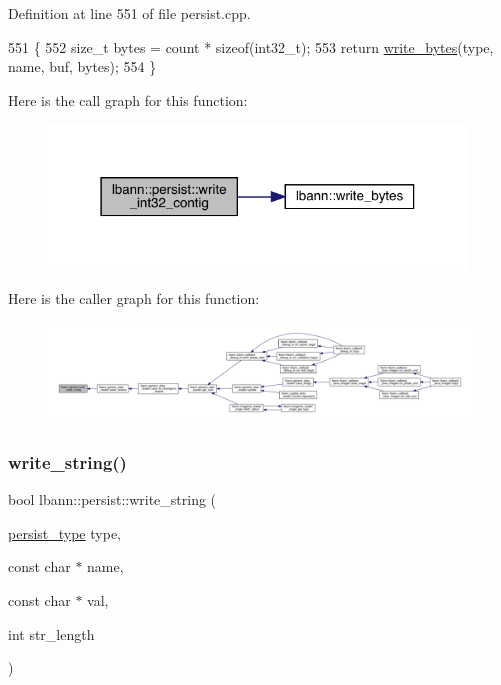 Definition at line 551 of file persist.\+cpp.


\begin{DoxyCode}
551                                                                                                            
        \{
552   \textcolor{keywordtype}{size\_t} bytes = count * \textcolor{keyword}{sizeof}(int32\_t);
553   \textcolor{keywordflow}{return} \hyperlink{classlbann_1_1persist_a8729c7c90f4ca3090cd678fce91a0eb0}{write\_bytes}(type, name, buf, bytes);
554 \}
\end{DoxyCode}
Here is the call graph for this function\+:\nopagebreak
\begin{figure}[H]
\begin{center}
\leavevmode
\includegraphics[width=315pt]{classlbann_1_1persist_a199cd86b1e1f0fd5f2d0458fc6d25828_cgraph}
\end{center}
\end{figure}
Here is the caller graph for this function\+:\nopagebreak
\begin{figure}[H]
\begin{center}
\leavevmode
\includegraphics[width=350pt]{classlbann_1_1persist_a199cd86b1e1f0fd5f2d0458fc6d25828_icgraph}
\end{center}
\end{figure}
\mbox{\label{classlbann_1_1persist_a04afef84e7caa8509e65367225ceeba5}} 
\subsubsection{\texorpdfstring{write\+\_\+string()}{write\_string()}}
{\footnotesize\ttfamily bool lbann\+::persist\+::write\+\_\+string (\begin{DoxyParamCaption}\item[{\hyperlink{namespacelbann_adee41f31f15f3906cbdcce4a1417eb56}{persist\+\_\+type}}]{type,  }\item[{const char $\ast$}]{name,  }\item[{const char $\ast$}]{val,  }\item[{int}]{str\+\_\+length }\end{DoxyParamCaption})}



